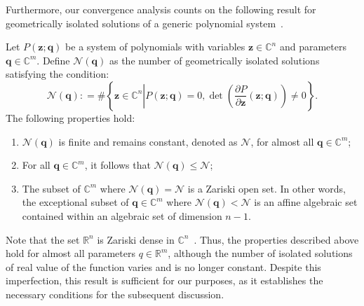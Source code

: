 \documentclass[onefignum,onetabnum]{siamart220329}
\begin{document}
{    
    
    
    
    
    
    Furthermore, our convergence analysis counts on the following result for geometrically isolated solutions of a generic polynomial system~\cite[Theorem 7.1.1]{Sommese05}.
    \begin{lemma}\label{lem:isolated}
    Let $P(\mathbf{z}; \mathbf{q})$ be a system of polynomials with variables $\mathbf{z}\in \mathbb{C}^n$ and parameters $\mathbf{q}\in\mathbb{C}^m$.  Define $\mathcal{N}(\mathbf{q})$ as the number of geometrically isolated solutions satisfying the condition: 
    \begin{equation*}
    \mathcal{N}(\mathbf{q}) : = \# \left\{\mathbf{z} \in\mathbb{C}^n \left |  P(\mathbf{z}; \mathbf{q}) = 0, \det\left (\frac{\partial P}{\partial \mathbf{z}} (\mathbf{z}; \mathbf{q}) \right) \neq 0\right.\right\}.
    \end{equation*}
    The following properties hold:
    \begin{enumerate}
    \item $\mathcal{N}(\mathbf{q})$ is finite and remains constant, denoted as $\mathcal{N}$, for almost all $\mathbf{q}\in \mathbb{C}^m$;
    
    \item For all $\mathbf{q}\in \mathbb{C}^m$, it follows that $\mathcal{N}(\mathbf{q}) \leq \mathcal{N}$;
    
    \item  The subset of $\mathbb{C}^m$ where $\mathcal{N}(\mathbf{q}) = \mathcal{N}$ is a Zariski open set. In other words, the exceptional subset of $\mathbf{q} \in \mathbb{C}^m$ where $\mathcal{N}(\mathbf{q}) <\mathcal{N}$ is an affine algebraic set contained within an algebraic set of dimension $n-1$.
    \end{enumerate}
    
    \end{lemma}
    Note that the set $\mathbb{R}^n$ is Zariski dense in $\mathbb{C}^n$~\cite{Dong2020}. Thus, the properties described above hold for almost all parameters $q \in \mathbb{R}^m$, although the number of isolated solutions of real value of the function varies and is no longer constant. Despite this imperfection, this result is sufficient for our purposes, as it establishes the necessary conditions for the subsequent discussion.
    
    
    
}
\end{document}
